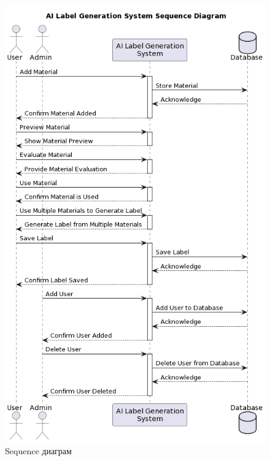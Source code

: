\begin{figure}[h!]
	\centering
	\includegraphics[scale=0.6]{src/pictures/sequence_diagram.png}
	\caption{Sequence диаграм}
\end{figure}